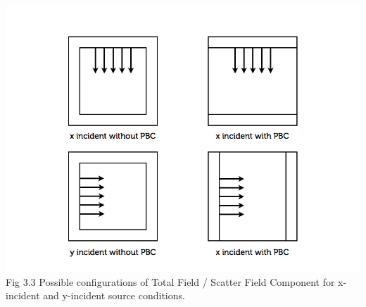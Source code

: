 \documentclass[openany]{book}
\begin{document}
\begin{center}
\includegraphics[scale=0.5]{images/tfsf-pbc.jpg}\\
Fig 3.3
Possible configurations of Total Field / Scatter Field Component for x-incident and y-incident source conditions.
\end{center}
\end{document}
